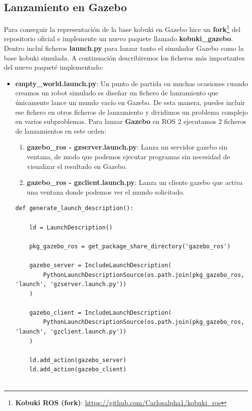 \subsection{Lanzamiento en Gazebo}
\label{subsec:kobuki_gazebo}

Para conseguir la representación de la base kobuki en Gazebo hice un \textbf{fork}\footnote{\textbf{Kobuki ROS (fork)}: \url{https://github.com/Carlosalpha1/kobuki_ros}} del repositorio oficial e implemente un nuevo paquete llamado \textbf{kobuki\_gazebo}. Dentro incluí ficheros \textbf{launch.py} para lanzar tanto el simulador Gazebo como la base kobuki simulada. A continuación describiremos los ficheros más importantes del nuevo paqueté implementado:

\begin{itemize}
	\item \textbf{empty\_world.launch.py}: Un punto de partida en muchas ocasiones cuando creamos un robot simulado es diseñar un fichero de lanzamiento que únicamente lance un mundo vacío en Gazebo. De esta manera, puedes incluir ese fichero en otros ficheros de lanzamiento y dividimos un problema complejo en varios subproblemas. Para lanzar \textbf{Gazebo} en ROS 2 ejecutamos 2 ficheros de lanzamientos en este orden:
	\begin{enumerate}
		\item \textbf{gazebo\_ros - gzserver.launch.py}: Lanza un servidor gazebo sin ventana, de modo que podemos ejecutar programas sin necesidad de visualizar el resultado en Gazebo.
		\item \textbf{gazebo\_ros - gzclient.launch.py}: Lanza un cliente gazebo que activa una ventana donde podemos ver el mundo solicitado.
	\end{enumerate}
	
	\cleardoublepage
\begin{code}[H]
\begin{lstlisting}[frame=single]
def generate_launch_description():

	ld = LaunchDescription()

	pkg_gazebo_ros = get_package_share_directory('gazebo_ros')
		
	gazebo_server = IncludeLaunchDescription(
		PythonLaunchDescriptionSource(os.path.join(pkg_gazebo_ros, 'launch', 'gzserver.launch.py'))
	)
		
	gazebo_client = IncludeLaunchDescription(
		PythonLaunchDescriptionSource(os.path.join(pkg_gazebo_ros, 'launch', 'gzclient.launch.py'))
	)
	
	ld.add_action(gazebo_server)
	ld.add_action(gazebo_client)
	

\end{lstlisting}
\end{code}
\end{itemize}
